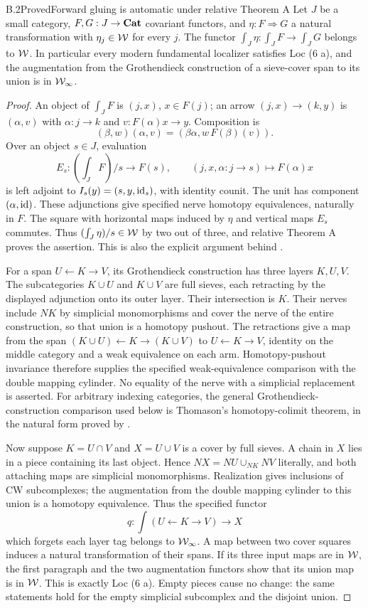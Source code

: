 \begin{claim}{B.2}{Proved}{Forward gluing is automatic under relative Theorem A}
Let $J$ be a small category, $F,G:J\to\mathbf{Cat}$ covariant functors, and $\eta:F\Rightarrow G$ a natural transformation with $\eta_j\in\mathcal{W}$ for every $j$. The functor $\int_J\eta:\int_JF\to\int_JG$ belongs to $\mathcal{W}$. In particular every modern fundamental localizer satisfies Loc (6 a), and the augmentation from the Grothendieck construction of a sieve-cover span to its union is in $\mathcal{W}_{\infty}$.
\end{claim}
\begin{proof}
An object of $\int_JF$ is $(j,x)$, $x\in F(j)$; an arrow $(j,x)\to(k,y)$ is $(\alpha,v)$ with $\alpha:j\to k$ and $v:F(\alpha)x\to y$. Composition is
\[
 (\beta,w)(\alpha,v)=(\beta\alpha,w\,F(\beta)(v)).
\]
Over an object $s\in J$, evaluation
\[
 E_s:(\int_JF)/s\longrightarrow F(s),\qquad
 (j,x,\alpha:j\to s)\longmapsto F(\alpha)x
\]
is left adjoint to $I_s(y)=(s,y,\mathrm{id}_s)$, with identity counit. The unit has component $(\alpha,\mathrm{id})$. These adjunctions give specified nerve homotopy equivalences, naturally in $F$. The square with horizontal maps induced by $\eta$ and vertical maps $E_s$ commutes. Thus $(\int_J\eta)/s\in\mathcal{W}$ by two out of three, and relative Theorem A proves the assertion. This is also the explicit argument behind \citet[Proposition 1.2.4]{RootCisinski2004}.

For a span $U\leftarrow K\to V$, its Grothendieck construction has three layers $K,U,V$. The subcategories $K\cup U$ and $K\cup V$ are full sieves, each retracting by the displayed adjunction onto its outer layer. Their intersection is $K$. Their nerves include $NK$ by simplicial monomorphisms and cover the nerve of the entire construction, so that union is a homotopy pushout. The retractions give a map from the span $(K\cup U)\leftarrow K\to(K\cup V)$ to $U\leftarrow K\to V$, identity on the middle category and a weak equivalence on each arm. Homotopy-pushout invariance therefore supplies the specified weak-equivalence comparison with the double mapping cylinder. No equality of the nerve with a simplicial replacement is asserted. For arbitrary indexing categories, the general Grothendieck-construction comparison used below is Thomason's homotopy-colimit theorem, in the natural form proved by \citet[Theorem 26.8 and Corollary 26.9]{RootChacholskiScherer2001}.

Now suppose $K=U\cap V$ and $X=U\cup V$ is a cover by full sieves. A chain in $X$ lies in a piece containing its last object. Hence $NX=NU\cup_{NK}NV$ literally, and both attaching maps are simplicial monomorphisms. Realization gives inclusions of CW subcomplexes; the augmentation from the double mapping cylinder to this union is a homotopy equivalence. Thus the specified functor
\[
 q:\int(U\leftarrow K\to V)\longrightarrow X
\]
which forgets each layer tag belongs to $\mathcal{W}_{\infty}$. A map between two cover squares induces a natural transformation of their spans. If its three input maps are in $\mathcal{W}$, the first paragraph and the two augmentation functors show that its union map is in $\mathcal{W}$. This is exactly Loc (6 a). Empty pieces cause no change: the same statements hold for the empty simplicial subcomplex and the disjoint union.
\end{proof}

